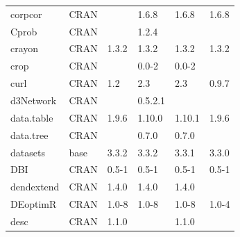 \begin{longtable}{llllll}
\rowcolor{black!5}
corpcor                       & \acrshort{CRAN}                      &             & 1.6.8       & 1.6.8          & 1.6.8              \\
\rowcolor{black!10}
Cprob                         & \acrshort{CRAN}                      &             & 1.2.4       &                &                   \\
\rowcolor{black!5}
crayon                        & \acrshort{CRAN}                      & 1.3.2       & 1.3.2       & 1.3.2          & 1.3.2              \\
\rowcolor{black!10}
crop                          & \acrshort{CRAN}                      &             & 0.0-2       & 0.0-2          &                   \\
\rowcolor{black!5}
curl                          & \acrshort{CRAN}                      & 1.2         & 2.3         & 2.3            & 0.9.7              \\
\rowcolor{black!10}
d3Network                     & \acrshort{CRAN}                      &             & 0.5.2.1     &                &                   \\
\rowcolor{black!5}
data.table                    & \acrshort{CRAN}                      & 1.9.6       & 1.10.0      & 1.10.1         & 1.9.6              \\
\rowcolor{black!10}
data.tree                     & \acrshort{CRAN}                      &             & 0.7.0       & 0.7.0          &                   \\
\rowcolor{black!5}
datasets                      & base                      & 3.3.2       & 3.3.2       & 3.3.1          & 3.3.0              \\
\rowcolor{black!10}
DBI                           & \acrshort{CRAN}                      & 0.5-1       & 0.5-1       & 0.5-1          & 0.5-1             \\
\rowcolor{black!5}
dendextend                    & \acrshort{CRAN}                      & 1.4.0       & 1.4.0       & 1.4.0          &                    \\
\rowcolor{black!10}
DEoptimR                      & \acrshort{CRAN}                      & 1.0-8       & 1.0-8       & 1.0-8          & 1.0-4             \\
\rowcolor{black!5}
desc                          & \acrshort{CRAN}                      & 1.1.0       &             & 1.1.0          &                    \\

\end{longtable}
